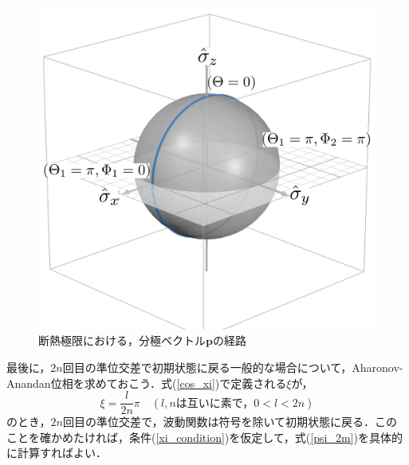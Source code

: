 \documentclass[a4paper, titlepage]{jsreport}
\begin{document}
\begin{figure}[htbp]
  \centering
  \includegraphics[scale=0.5]{figures/AAP_2.png}
  \caption{断熱極限における，分極ベクトル$\bm{p}$の経路}
  \label{fig:AAP_2}
\end{figure}


最後に，$2n$回目の準位交差で初期状態に戻る一般的な場合について，Aharonov-Anandan位相を求めておこう．式(\ref{cos_xi})で定義される$\xi$が，
\begin{equation}
  \xi = \frac{l}{2n} \pi \quad (l,n \text{は互いに素で，}0 < l < 2n) \label{xi_condition}
\end{equation}
のとき，$2n$回目の準位交差で，波動関数は符号を除いて初期状態に戻る．このことを確かめたければ，条件(\ref{xi_condition})を仮定して，式(\ref{psi_2m})を具体的に計算すればよい．
\end{document}
